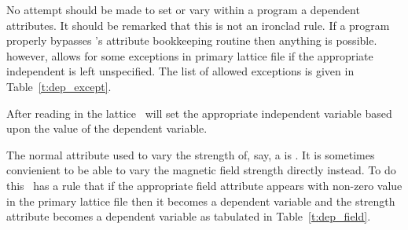 No attempt should be made to set or vary within a program a dependent
attributes. It should be remarked that this is not an ironclad rule.
If a program properly bypasses \bmad's attribute bookkeeping routine
then anything is possible. \bmad\, however, allows for some exceptions
in primary lattice file if the appropriate independent is left unspecified.
The list of allowed exceptions is given in Table~\ref{t:dep_except}.
\begin{table}[h]
\caption {Dependent variables that can be set in a primary lattice file.}
\label{t:dep_except}
\end{table}
After reading in the lattice \bmad\ will set the appropriate
independent variable based upon the value of the dependent variable.

The normal attribute used to vary the strength of, say, a
 is .  It is sometimes convienient to be able to
vary the magnetic field strength directly instead. To do this \bmad\ has
a rule that if the appropriate field attribute appears with non-zero value in the
primary lattice file then it becomes a dependent variable and the strength attribute
becomes a dependent variable as tabulated in Table~\ref{t:dep_field}.
\begin{table}[h]
\caption {Field and Strength Attributes.}
\label{t:dep_field}
\end{table}

